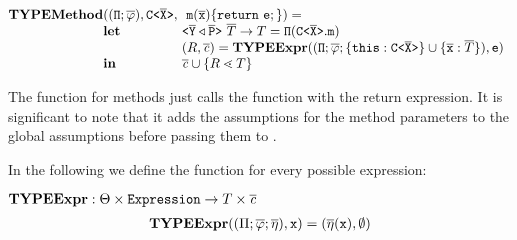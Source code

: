 \documentclass[a4paper,USenglish,cleveref, autoref, thm-restate]{lipics-v2021}
\begin{document}
\begin{gather*}
\begin{array}{@{}l@{}l@{}l}
  \typeMethod & (\ensuremath{(\mv{\Pi} ; \overline{\fieldAssumption})}, \exptype{C}{\ol{X}},\ &\  \mathtt{m}(\ol{x})\{ \mathtt{ return }\ \texttt{e}; \}) =\\
              & \textbf{let} & \exptype{}{\ol{Y} \triangleleft \ol{P}}\ \overline{T} \to T  = \mv{\Pi} (\exptype{C}{\ol{X}}.\mv{m})
  \\
              & %
                                                                                              & ({R}, \consSet) =
                                                                                                \typeExpr((\mv\Pi ;
                                                                                                \overline{\fieldAssumption}; \set{\mv{this} :
                                                                                                \exptype{C}{\ol{X}} } \cup \set{ \ol{x} : \overline{{T}} }), \texttt{e})\\
              & \mathbf{in}
                                                                                              & \consSet \cup \set{{R} \lessdot {T}}\\
\end{array}
\end{gather*}

The \typeMethod{} function for methods just calls the \typeExpr{} function with the
return expression. It is significant to note that it adds the assumptions for the method parameters to the global assumptions before passing them to \typeExpr.

\smallskip

In the following we define the \typeExpr{} function for every possible expression:

\smallskip

\noindent
$\textbf{TYPEExpr}: \Theta \times
\texttt{Expression} \rightarrow {T} \times \overline{\mathit{c}}
$
\begin{gather*}
  \textbf{TYPEExpr} (({\Pi} ; \overline{\mathtt{\varphi}};
  \overline{\mathtt{\eta}}), \mathtt{x}) =
  (\overline{\mathtt{\eta}} ({\tt x}) , \emptyset)
\end{gather*}
\end{document}
